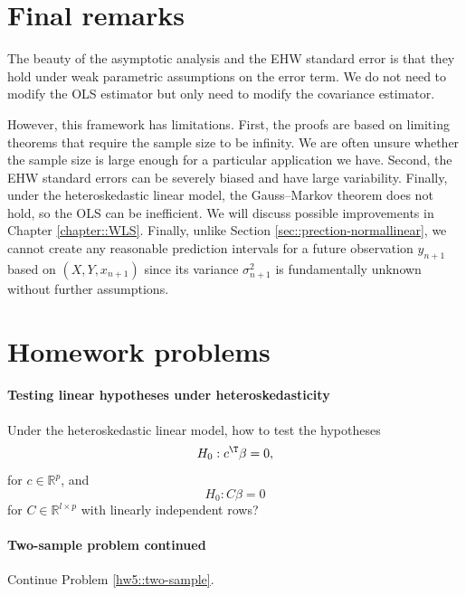 \section{Final remarks}

The beauty of the asymptotic analysis and the EHW standard error is that they hold under weak parametric assumptions on the error term. We do not need to modify the OLS estimator but only need to modify the covariance estimator. 

However, this framework has limitations. First, the proofs are based on limiting theorems that require the sample size to be infinity. We are often unsure whether the sample size is large enough for a particular application we have. Second, the EHW standard errors can be severely biased and have large variability. Finally, under the heteroskedastic linear model, the Gauss--Markov theorem does not hold, so the OLS can be inefficient. We will discuss possible improvements in Chapter \ref{chapter::WLS}. Finally, unlike Section \ref{sec::prection-normallinear}, we cannot create any reasonable prediction intervals for a future observation $y_{n+1}$ based on $(X,Y, x_{n+1})$ since its variance $\sigma_{n+1}^2$ is fundamentally unknown without further assumptions. 



\section{Homework problems}

\paragraph{Testing linear hypotheses under heteroskedasticity} Under the heteroskedastic linear model, how to test the hypotheses
$$
H_0: c^{\T} \beta = 0,  
$$
for $c\in \mathbb{R}^p$,
and
$$
H_0:  C\beta = 0
$$
for $ C\in \mathbb{R}^{l\times p}$ with linearly independent rows?



\paragraph{Two-sample problem continued}\label{hw08::twosample-ehw}

Continue Problem \ref{hw5::two-sample}. 

